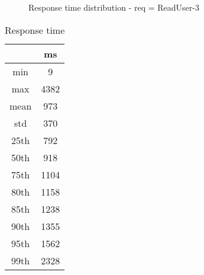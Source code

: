 \begin{minipage}{0.75\linewidth}
\begin{figure}[h]
\begin{adjustbox}{max width=1.0\linewidth, keepaspectratio}
  \end{adjustbox}
  \caption{Response time distribution - req = ReadUser-3}
\end{figure}
\end{minipage}\hfill\begin{minipage}{0.18\linewidth}
\begin{table}[h]
\begin{tabular}{|cc|}
\hline
\textbf{} & \textbf{ms}\\ \hline
 \Xhline{0.005\arrayrulewidth}
min & 9\\
 \Xhline{0.005\arrayrulewidth}
max & 4382\\
 \Xhline{0.005\arrayrulewidth}
mean & 973\\
 \Xhline{0.005\arrayrulewidth}
std & 370\\
\hline
\hline
 \Xhline{0.005\arrayrulewidth}
25th & 792\\
 \Xhline{0.005\arrayrulewidth}
50th & 918\\
 \Xhline{0.005\arrayrulewidth}
75th & 1104\\
 \Xhline{0.005\arrayrulewidth}
80th & 1158\\
 \Xhline{0.005\arrayrulewidth}
85th & 1238\\
 \Xhline{0.005\arrayrulewidth}
90th & 1355\\
 \Xhline{0.005\arrayrulewidth}
95th & 1562\\
 \Xhline{0.005\arrayrulewidth}
99th & 2328\\
\hline
\end{tabular}
\caption{Response time}
\end{table}
\end{minipage}\hfill